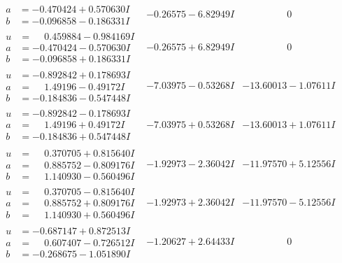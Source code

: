 \documentclass[1p]{elsarticle_modified}
\theoremstyle{definition}
\begin{document}
$$\begin{array}{c|c|c}
\begin{aligned}
a &= -0.470424 + 0.570630 I \\
b &= -0.096858 - 0.186331 I\end{aligned}
 & -0.26575 - 6.82949 I & \phantom{-0.000000 } 0 \\ \hline\begin{aligned}
u &= \phantom{-}0.459884 - 0.984169 I \\
a &= -0.470424 - 0.570630 I \\
b &= -0.096858 + 0.186331 I\end{aligned}
 & -0.26575 + 6.82949 I & \phantom{-0.000000 } 0 \\ \hline\begin{aligned}
u &= -0.892842 + 0.178693 I \\
a &= \phantom{-}1.49196 - 0.49172 I \\
b &= -0.184836 - 0.547448 I\end{aligned}
 & -7.03975 - 0.53268 I & -13.60013 - 1.07611 I \\ \hline\begin{aligned}
u &= -0.892842 - 0.178693 I \\
a &= \phantom{-}1.49196 + 0.49172 I \\
b &= -0.184836 + 0.547448 I\end{aligned}
 & -7.03975 + 0.53268 I & -13.60013 + 1.07611 I \\ \hline\begin{aligned}
u &= \phantom{-}0.370705 + 0.815640 I \\
a &= \phantom{-}0.885752 - 0.809176 I \\
b &= \phantom{-}1.140930 - 0.560496 I\end{aligned}
 & -1.92973 - 2.36042 I & -11.97570 + 5.12556 I \\ \hline\begin{aligned}
u &= \phantom{-}0.370705 - 0.815640 I \\
a &= \phantom{-}0.885752 + 0.809176 I \\
b &= \phantom{-}1.140930 + 0.560496 I\end{aligned}
 & -1.92973 + 2.36042 I & -11.97570 - 5.12556 I \\ \hline\begin{aligned}
u &= -0.687147 + 0.872513 I \\
a &= \phantom{-}0.607407 - 0.726512 I \\
b &= -0.268675 - 1.051890 I\end{aligned}
 & -1.20627 + 2.64433 I & \phantom{-0.000000 } 0 \\ \hline\begin{aligned}

\end{aligned}
\end{array}$$
\end{document}

